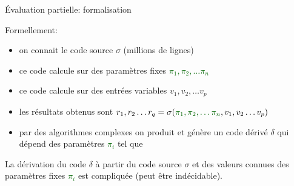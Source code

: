 \documentclass[final,a4]{beamer}
\begin{document}
 \begin{frame}{Évaluation partielle: formalisation}
   
Formellement:

\begin{itemize}
\item on connait le code source $\sigma$ (millions de lignes)
\item ce code calcule sur des paramètres fixes \textcolor{DarkGreen}{$\pi_1, \pi_2, \ldots \pi_n$}
\item ce code calcule sur des entrées variables $v_1, v_2, \ldots v_p$
  
\item les résultats obtenus sont $r_1, r_2 \ldots r_q = \sigma (\textcolor{DarkGreen}{\pi_1, \pi_2, \ldots \pi_n}, v_1, v_2 \ldots v_p)$
\item par des algorithmes complexes on produit et génère un code
  dérivé $\delta$ qui dépend des paramètres \textcolor{DarkGreen}{$\pi_i$} tel que
\end{itemize}

La dérivation du code $\delta$ à partir du code source $\sigma$ et des
valeurs connues des paramètres fixes \textcolor{DarkGreen}{$\pi_i$} est compliquée (peut être indécidable). 
 \end{frame}

 
\end{document}
